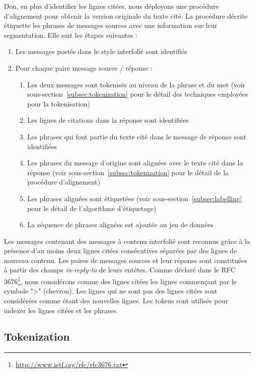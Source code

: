 Don, en plus d'identifier les lignes citées, nous déployons une procédure d'alignement pour obtenir la version originale du texte cité. La procédure décrite étiquette les phrases de messages sources avec une information sur leur segmentation. Elle suit les étapes suivantes :

\begin{enumerate}
    \item Les messages postés dans le style interfolié sont identifiés
    \item Pour chaque paire message source / réponse :
    \begin{enumerate}
        \item Les deux messages sont tokenisés au niveau de la phrase et du mot (voir sous-section~\ref{subsec:tokenization} pour le détail des techniques employées pour la tokenisation)
        \item Les lignes de citations dans la réponse sont identifiées
        \item Les phrases qui font partie du texte cité dans le message de réponse sont identifiées
        \item Les phrases du message d'origine sont alignées avec le texte cité dans la réponse (voir sous-section~\ref{subsec:tokenization} pour le détail de la procédure d'alignement)
        \item Les phrases alignées sont étiquetées (voir sous-section~\ref{subsec:labelling} pour le détail de l'algorithme d'étiquetage)
        \item La séquence de phrases alignées est ajoutée au jeu de données
    \end{enumerate}
\end{enumerate}

Les messages contenant des messages à contenu interfolié sont reconnus grâce à la présence d'au moins deux lignes citées consécutives séparées par des lignes de nouveau contenu. Les paires de messages sources et leur réponse sont constituées à partir des champs \emph{in-reply-to} de leurs entêtes. Comme déclaré dans le RFC 3676\footnote{\url{http://www.ietf.org/rfc/rfc3676.txt}}, nous considérons comme des lignes citées les lignes commençant par le symbole "\textgreater" (chevron). Les lignes qui ne sont pas des lignes citées sont considérées comme étant des nouvelles lignes. Les tokens sont utilisés pour indexer les lignes citées et les phrases.

\subsection{Tokenization}

